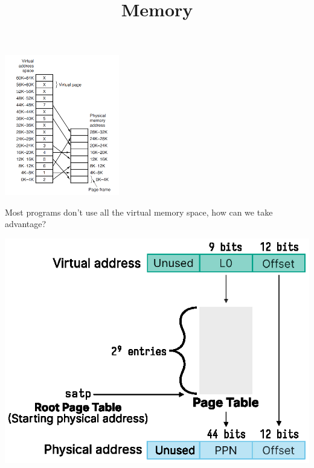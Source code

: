 

\title{Memory}



\begin{frame}
    \titlepage
\end{frame}

\begin{slide}


    \includegraphics[width=50mm]{unmapped-mem.png}

\end{slide}

\begin{slide}
    

    Most programs don't use all the virtual memory space, how can we take
    advantage?

\end{slide}
  
\begin{slide}
    

    \centering
    \includegraphics{single-level-page-table-small.eps}

\end{slide}

